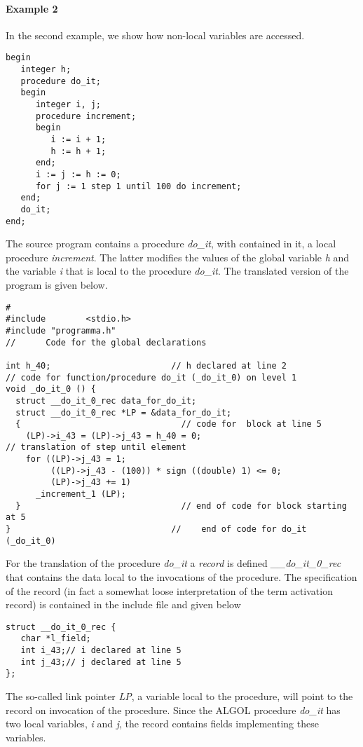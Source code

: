\documentclass[11pt]{article}
\begin{document}
\paragraph{Example 2}
In the second example, we show how non-local variables are accessed.
{\footnotesize
\begin{verbatim}
begin
   integer h;
   procedure do_it;
   begin
      integer i, j;
      procedure increment;
      begin
         i := i + 1;
         h := h + 1;
      end;
      i := j := h := 0;
      for j := 1 step 1 until 100 do increment;
   end;
   do_it;
end;
\end{verbatim}
}

The source program contains a procedure {\em do\_it},
with contained in it, a local procedure {\em increment}.
The latter modifies the values of the global variable {\em h}
and the variable {\em i} that is local to the procedure {\em do\_it}.
The translated version of the program is given below.
{\footnotesize
\begin{verbatim}
#
#include        <stdio.h>
#include "programma.h"
//      Code for the global declarations

int h_40;                        // h declared at line 2
// code for function/procedure do_it (_do_it_0) on level 1
void _do_it_0 () {
  struct __do_it_0_rec data_for_do_it;
  struct __do_it_0_rec *LP = &data_for_do_it;
  {                                // code for  block at line 5 
    (LP)->i_43 = (LP)->j_43 = h_40 = 0;
// translation of step until element
    for ((LP)->j_43 = 1;
         ((LP)->j_43 - (100)) * sign ((double) 1) <= 0;
         (LP)->j_43 += 1)
      _increment_1 (LP);
  }                                // end of code for block starting at 5
}                                //    end of code for do_it (_do_it_0)
\end{verbatim}
}

For the translation of the procedure {\em do\_it} a {\em record} is
defined {\em \_\_do\_it\_0\_rec} that contains the data local
to the invocations of the procedure. The specification of
the record (in fact a  somewhat loose interpretation of the term
activation record) is contained in the include file and given
below
{\footnotesize
\begin{verbatim}
struct __do_it_0_rec {
   char *l_field;
   int i_43;// i declared at line 5
   int j_43;// j declared at line 5
};
\end{verbatim}
}
The so-called link pointer {\em LP}, a variable local to the procedure,
will point to the record on invocation of the procedure.
Since the ALGOL procedure {\em do\_it} has two local
variables, {\em i} and {\em j}, the record contains
fields implementing these variables.
\end{document}

